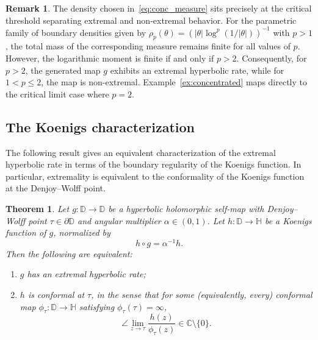 \documentclass[12pt]{amsart}
\numberwithin{equation}{section}
\theoremstyle{plain}
\newtheorem{theorem}[equation]{Theorem}
\theoremstyle{definition}
\newtheorem{remark}[equation]{Remark}
\begin{document}
\begin{remark}
The density chosen in~\eqref{eq:conc_measure} sits precisely at the critical threshold separating extremal and non-extremal behavior. For the parametric family of boundary densities given by $\rho_p(\theta) = (|\theta|\log^p(1/|\theta|))^{-1}$ with $p>1$, the total mass of the corresponding measure remains finite for all values of $p$. However, the logarithmic moment is finite if and only if $p>2$. Consequently, for $p>2$, the generated map $g$ exhibits an extremal hyperbolic rate, while for $1<p\le 2$, the map is non-extremal. Example~\ref{ex:concentrated} maps directly to the critical limit case where $p=2$.
\end{remark}




\subsection{The Koenigs characterization}
\label{subsec:koenigs_characterization}

The following result gives an equivalent characterization of the
extremal hyperbolic rate in terms of the boundary regularity of the
Koenigs function. In particular, extremality is equivalent to the
conformality of the Koenigs function at the Denjoy--Wolff point.

\begin{theorem}
\label{thm:koenigs_criterion}
Let $g:\mathbb{D}\to\mathbb{D}$ be a hyperbolic holomorphic self-map
with Denjoy--Wolff point $\tau\in\partial\mathbb{D}$ and angular
multiplier $\alpha\in(0,1)$. Let
$h:\mathbb{D}\to\mathbb{H}$ be a Koenigs function of $g$, normalized by
\begin{equation*}
h\circ g=\alpha^{-1}h.
\end{equation*}
Then the following are equivalent:
\begin{enumerate}
\item[\emph{(i)}] $g$ has an extremal hyperbolic rate;
\item[\emph{(ii)}] $h$ is conformal at $\tau$, in the sense that
for some (equivalently, every) conformal map
$\phi_\tau:\mathbb{D}\to\mathbb{H}$ satisfying
$\phi_\tau(\tau)=\infty$,
\begin{equation*}
\label{eq:koenigs_boundary_ratio}
\angle\lim_{z\to\tau}
\frac{h(z)}{\phi_\tau(z)}
\in\mathbb{C}\setminus\{0\}.
\end{equation*}
\end{enumerate}
\end{theorem}
\end{document}
